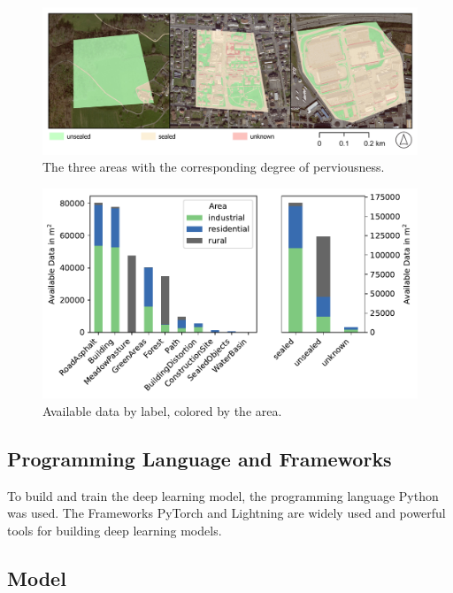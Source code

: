 \begin{figure}[H]
    \centering
    \captionsetup{width=0.8\linewidth}
    \includegraphics[width=\linewidth]{figures/map_aoi_sealing.pdf}
    \caption{The three areas with the corresponding degree of perviousness.}
    \label{fig:sealed_areas}
\end{figure}

\begin{figure}[H]
    \centering
    \captionsetup{width=0.8\linewidth}
    \includegraphics[scale=0.6]{figures/area_by_category_and_seal.pdf}
    \caption{Available data by label, colored by the area.}
    \label{fig:label_distribution}
\end{figure}


\subsection{Programming Language and Frameworks}%

To build and train the deep learning model, the programming language Python was used.
The Frameworks PyTorch and Lightning are widely used and powerful tools for building
deep learning models.


\subsection{Model}%



